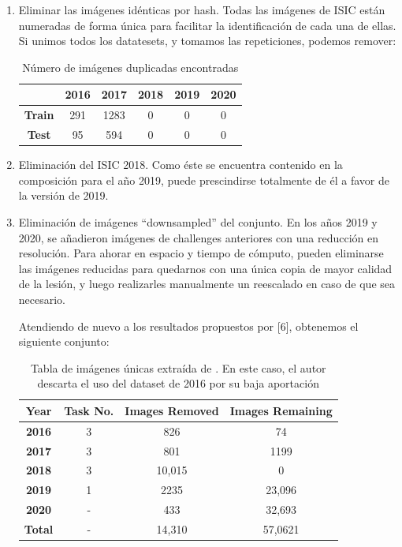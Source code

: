\begin{enumerate}
	
	
	\item Eliminar las imágenes idénticas por hash. Todas las imágenes de ISIC están numeradas de forma única para facilitar la identificación de cada una de ellas. Si unimos todos los datatesets, y tomamos las repeticiones, podemos remover:
	
	\begin{table}[H]
		\centering
		\begin{tabular}{|c|c|c|c|c|c|}
			\hline
			\textbf{} & \textbf{2016} & \textbf{2017} & \textbf{2018} & \textbf{2019} & \textbf{2020} \\ \hline
			\textbf{Train} & 291 & 1283 & 0 & 0 & 0 \\ \hline
			\textbf{Test} & 95 & 594 & 0 & 0 & 0 \\ \hline
		\end{tabular}
		\caption{Número de imágenes duplicadas encontradas \cite{CASSIDY2022102305}}
	\end{table}
	
	
	\item 	Eliminación del ISIC 2018. Como éste se encuentra contenido en la composición para el año 2019, puede prescindirse totalmente de él a favor de la versión de 2019.
	\item 	Eliminación de imágenes “downsampled” del conjunto. En los años 2019 y 2020, se añadieron imágenes de challenges anteriores con una reducción en resolución. Para ahorar en espacio y tiempo de cómputo, pueden eliminarse las imágenes reducidas para quedarnos con una única copia de mayor calidad de la lesión, y luego realizarles manualmente un reescalado en caso de que sea necesario.
	
	Atendiendo de nuevo a los resultados propuestos por [6], obtenemos el siguiente conjunto: 
	
	\begin{table}[H]
		\centering
		\begin{tabular}{|c|c|c|c|}
			\hline
			\textbf{Year} & \textbf{Task No.} & \textbf{Images Removed} & \textbf{Images Remaining} \\ \hline
			\textbf{2016} & 3 & 826 & 74 \\ \hline
			\textbf{2017} & 3 & 801 & 1199 \\ \hline
			\textbf{2018} & 3 & 10,015 & 0 \\ \hline
			\textbf{2019} & 1 & 2235 & 23,096 \\ \hline
			\textbf{2020} & - & 433 & 32,693 \\ \hline
			\textbf{Total} & - & 14,310 & 57,0621 \\ \hline
		\end{tabular}
		\caption{Tabla de imágenes únicas extraída de \cite{CASSIDY2022102305}. En este caso, el autor descarta el uso del dataset de 2016 por su baja aportación}
	\end{table}
	
\end{enumerate}

